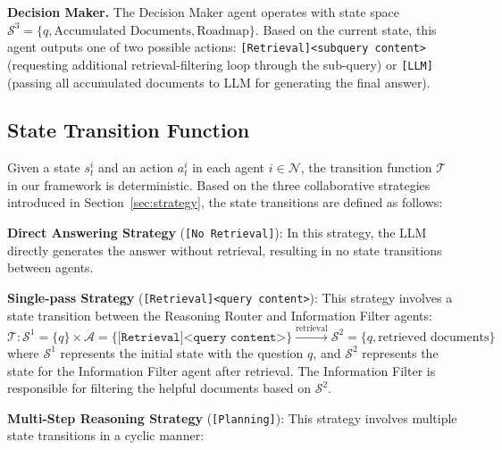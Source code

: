 \textbf{Decision Maker.}
The Decision Maker agent operates with state space $\mathcal{S}^3=\{q, \text{Accumulated Documents}, \text{Roadmap}\}$.
Based on the current state, this agent outputs one of two possible actions: \texttt{[Retrieval]<subquery content>} (requesting additional retrieval-filtering loop through the sub-query) or \texttt{[LLM]} (passing all accumulated documents to LLM for generating the final answer).



\subsection{State Transition Function}\label{app:transition_details}
Given a state $s_t^i$ and an action $a_t^i$ in each agent $i\in \mathcal{N}$, the transition function $\mathcal{T}$ in our framework is deterministic.
Based on the three collaborative strategies introduced in Section~\ref{sec:strategy}, the state transitions are defined as follows:

\textbf{Direct Answering Strategy} (\texttt{[No Retrieval]}): In this strategy, the LLM directly generates the answer without retrieval, resulting in no state transitions between agents.

\textbf{Single-pass Strategy} (\texttt{[Retrieval]<query content>}): This strategy involves a state transition between the Reasoning Router and Information Filter agents:
\begin{equation}
    \mathcal{T}: \mathcal{S}^1=\{q\} \times \mathcal{A}=\{\texttt{[Retrieval]<query content>}\} \xrightarrow{\text{retrieval}} \mathcal{S}^2 = \{q, \text{retrieved documents}\}
\end{equation}
where $\mathcal{S}^1$ represents the initial state with the question $q$, and $\mathcal{S}^2$ represents the state for the Information Filter agent after retrieval. The Information Filter is responsible for filtering the helpful documents based on $\mathcal{S}^2$.


\textbf{Multi-Step Reasoning Strategy} (\texttt{[Planning]}): This strategy involves multiple state transitions in a cyclic manner:


